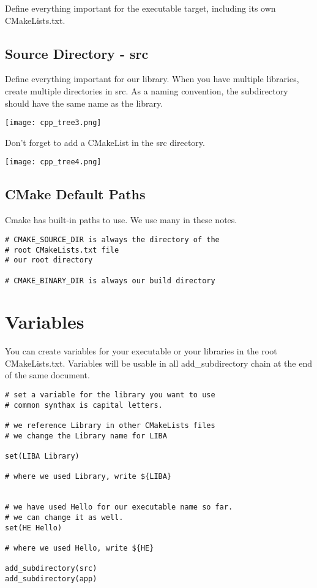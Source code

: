 Define everything important for the executable target, including its own CMakeLists.txt.

\subsection{Source Directory - src}

Define everything important for our library. When you have multiple libraries, create multiple directories in
src. As a naming convention, the subdirectory should have the same name as the library.

\begin{center}
    \texttt{[image: cpp\_tree3.png]}
\end{center}

Don't forget to add a CMakeList in the src directory.


\begin{center}
    \texttt{[image: cpp\_tree4.png]}
\end{center}

\subsection{CMake Default Paths}

Cmake has built-in paths to use. We use many in these notes.

\begin{verbatim}
# CMAKE_SOURCE_DIR is always the directory of the
# root CMakeLists.txt file
# our root directory

# CMAKE_BINARY_DIR is always our build directory
\end{verbatim}

\section{Variables}

You can create variables for your executable or your libraries in the root CMakeLists.txt. Variables
will be usable in all add\_subdirectory chain at the end of the same document.

\begin{verbatim}
# set a variable for the library you want to use
# common synthax is capital letters.

# we reference Library in other CMakeLists files
# we change the Library name for LIBA

set(LIBA Library)

# where we used Library, write ${LIBA}


# we have used Hello for our executable name so far.
# we can change it as well.
set(HE Hello)

# where we used Hello, write ${HE}

add_subdirectory(src)
add_subdirectory(app)
\end{verbatim}



